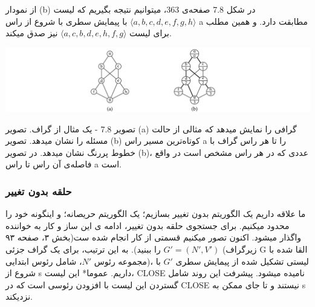 \documentclass{book} %
\begin{document}
از نمودار (b) در شکل 7.8 صفحه‌ی 363، میتوانیم نتیجه بگیریم که لیست $⟨a, b, c, d, e, f, g, h⟩$ با پیمایش سطری با شروع از راس a مطابقت دارد. و همین مطلب برای لیست $⟨a, c, b, d, e, h, f, g⟩$ نیز صدق میکند.

    
  
  



\begin{center}
    \includegraphics{./f1.pdf}
\end{center}

تصویر 7.8 - یک مثال از گراف. تصویر (a) گرافی را نمایش میدهد که مثالی از حالت مسئله را نشان میدهد.  تصویر (b) کوتاه‌ترین مسیر راس a را تا هر راس گراف با خطوط پررنگ نشان میدهد. در تصویر (b)، عددی که در هر راس مشخص است در واقع فاصله‌ی آن راس تا راس a است.



\newpage
\subsubsection*{حلقه بدون تغییر}

ما علاقه داریم یک الگوریتم بدون تغییر بسازیم؛ یک الگوریتم حریصانه؛ و اینگونه خود را محدود میکنیم. برای جستجوی حلقه بدون تغییر، ادامه ی این ساز و کار به خواننده واگذار میشود. اکنون تصور میکنیم قسمتی از کار انجام شده ست(بخش ۳، صفحه ۹۳ را ببنید). به این ترتیب، برای یک گراف جزئی $G′ = (N′, V′)$ (زیرگراف G القا شده با مجموعه رئوس $N'$، شامل رئوس ابتدایی)، لیستی تشکیل شده از پیمایش سطری $G'$ با شروع از s داریم.
عموما* این لیست، CLOSE نامیده میشود. پیشرفت این روند شامل گستردن این لیست با افزودن رئوسی است که در CLOSE نیستند و تا جای ممکن به s نزدیکند.
\end{document}
